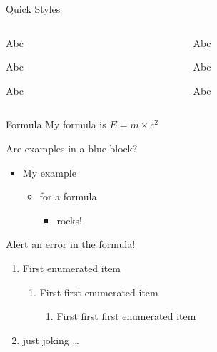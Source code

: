 \documentclass[aspectratio=43]{beamer}
\begin{document}
\begin{frame}{Quick Styles}
\begin{columns}
    \begin{column}{0.12\paperwidth}
    \begin{yellow0block}{Abc}
    \end{yellow0block}
    \begin{yellow1block}{Abc}
    \end{yellow1block}
    \begin{yellow2block}{Abc}
    \end{yellow2block}
    \end{column}

    \begin{column}{0.12\paperwidth}
    \begin{red0block}{Abc}
    \end{red0block}
    \begin{red1block}{Abc}
    \end{red1block}
    \begin{red2block}{Abc}
    \end{red2block}
    \end{column}

\end{columns}
\end{frame}

\begin{frame}{Formula}
    My formula is $E=m\times c^2$
    \begin{blue2block}{Are examples in a blue block?}
    \begin{itemize}
        \item My example
        \begin{itemize}
            \item for a formula
            \begin{itemize}
                \item rocks!
            \end{itemize}
        \end{itemize}
    \end{itemize}
    \end{blue2block}

    \begin{red2block}{Alert an error in the formula!}
    \begin{enumerate}
        \item First enumerated item
        \begin{enumerate}
            \item First first enumerated item
            \begin{enumerate}
                \item First first first enumerated item
            \end{enumerate}
        \end{enumerate}
        \item just joking \dots
    \end{enumerate}
    \end{red2block}
\end{frame}
\end{document}
